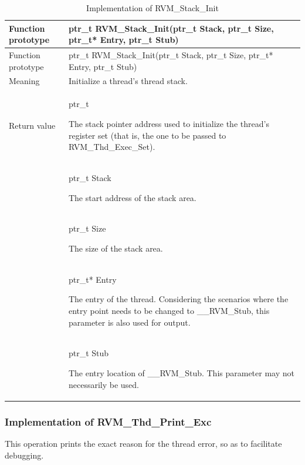 \begin{xltabular}{\textwidth}{@{}>{\hsize\raggedright\arraybackslash}X>{\hsize\raggedright\arraybackslash}X@{}}
\caption{Implementation of RVM\_\allowbreak{}Stack\_\allowbreak{}Init}\label{tab:8-15}\\
\toprule
Function prototype & ptr\_\allowbreak{}t RVM\_\allowbreak{}Stack\_\allowbreak{}Init(ptr\_\allowbreak{}t Stack, ptr\_\allowbreak{}t Size, ptr\_\allowbreak{}t*
Entry, ptr\_\allowbreak{}t Stub)\tabularnewline
\endfirsthead
\toprule
Function prototype & ptr\_\allowbreak{}t RVM\_\allowbreak{}Stack\_\allowbreak{}Init(ptr\_\allowbreak{}t Stack, ptr\_\allowbreak{}t Size, ptr\_\allowbreak{}t*
Entry, ptr\_\allowbreak{}t Stub)\tabularnewline
\midrule
\endhead
\bottomrule
\endlastfoot
Meaning & Initialize a thread's thread stack.\tabularnewline
Return value\strut
 & ptr\_\allowbreak{}t

The stack pointer address used to initialize the thread's register set (that is, the one to be passed to RVM\_Thd\_Exec\_Set).\strut
\tabularnewline
{} & ptr\_\allowbreak{}t Stack

The start address of the stack area.\strut
\tabularnewline
\strut
 & ptr\_\allowbreak{}t Size

The size of the stack area.\strut
\tabularnewline
\strut
 & ptr\_\allowbreak{}t* Entry

The entry of the thread. Considering the scenarios where the entry point needs to be changed to \_\allowbreak{}\_\allowbreak{}RVM\_\allowbreak{}Stub, this parameter is also used for output.\strut
\tabularnewline
\strut
 & ptr\_\allowbreak{}t Stub

The entry location of \_\allowbreak{}\_\allowbreak{}RVM\_\allowbreak{}Stub. This parameter may not necessarily be used.\strut
\tabularnewline
\end{xltabular}

\subsubsection{Implementation of RVM\_Thd\_Print\_Exc}\label{subsubsec:8-2-7-3}

This operation prints the exact reason for the thread error, so as to facilitate debugging.

